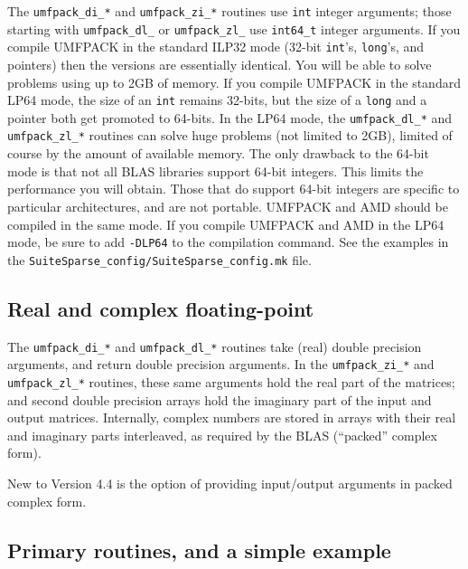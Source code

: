 \documentclass[11pt]{article}
\begin{document}
The {\tt umfpack\_di\_*} and {\tt umfpack\_zi\_*} routines use {\tt int} integer
arguments; those starting with {\tt umfpack\_dl\_} or {\tt umfpack\_zl\_}
use \verb'int64_t' integer arguments.  If you compile UMFPACK in the standard
ILP32 mode (32-bit {\tt int}'s, {\tt long}'s, and pointers) then the versions
are essentially identical.  You will be able to solve problems using up to 2GB
of memory.  If you compile UMFPACK in the standard LP64 mode, the size of an
{\tt int} remains 32-bits, but the size of a {\tt long} and a pointer both get
promoted to 64-bits.  In the LP64 mode, the {\tt umfpack\_dl\_*}
and {\tt umfpack\_zl\_*} routines can solve huge
problems (not limited to 2GB), limited of course by the amount of available
memory.  The only drawback to the 64-bit mode is that not all BLAS libraries
support 64-bit integers.  This limits the performance you will obtain.
Those that do support 64-bit integers are specific to particular
architectures, and are not portable.  UMFPACK and AMD should be compiled
in the same mode.
If you compile UMFPACK and AMD in the LP64 mode,
be sure to add {\tt -DLP64} to the compilation command.  See the examples in
the {\tt SuiteSparse\_config/SuiteSparse\_config.mk} file.

\subsection{Real and complex floating-point}

The {\tt umfpack\_di\_*} and {\tt umfpack\_dl\_*} routines take (real) double
precision arguments, and return double precision arguments.  In the
{\tt umfpack\_zi\_*} and {\tt umfpack\_zl\_*} routines, these same arguments
hold the real part of the matrices; and second double precision arrays hold
the imaginary part of the input and output matrices.  Internally, complex
numbers are stored in arrays with their real and imaginary parts interleaved,
as required by the BLAS (``packed'' complex form).

New to Version 4.4 is the option of providing input/output arguments
in packed complex form.

\subsection{Primary routines, and a simple example}
\end{document}
